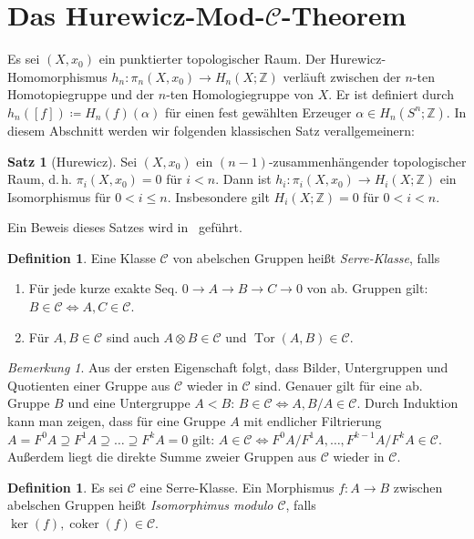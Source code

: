 \documentclass[11pt, a4paper, german]{article}
\theoremstyle{definition}
\newtheorem{satz}[lem]{Satz}
\newtheorem{defn}[lem]{Definition}
\theoremstyle{remark}
\newtheorem*{bem}{Bemerkung}
\newcommand{\Z}{\mathbb{Z}} %
\DeclareMathOperator{\coker}{coker} %
\DeclareMathOperator{\Tor}{Tor} %
\newcommand{\SC}{\mathcal{C}} %
\renewcommand{\dh}{d.\,h.} %
\begin{document}
\section{Das Hurewicz-Mod-$\SC$-Theorem}

Es sei $(X, x_0)$ ein punktierter topologischer Raum.
Der Hurewicz-Homomorphismus $h_n : \pi_n(X, x_0) \to H_n(X; \Z)$ verläuft zwischen der $n$-ten Homotopiegruppe und der $n$-ten Homologiegruppe von $X$.
Er ist definiert durch $h_n([f]) \coloneqq H_n(f)(\alpha)$ für einen fest gewählten Erzeuger $\alpha \in H_n(S^n; \Z)$.
In diesem Abschnitt werden wir folgenden klassischen Satz verallgemeinern:

\begin{satz}[Hurewicz]
  Sei $(X, x_0)$ ein $(n{-}1)$-zusammenhängender topologischer Raum, \dh{} $\pi_i(X, x_0) = 0$ für $i < n$.
  Dann ist $h_i : \pi_i(X, x_0) \to H_i(X; \Z)$ ein Isomorphismus für $0 < i \leq n$.
  Insbesondere gilt $H_i(X; \Z) = 0$ für $0 < i < n$.
\end{satz}

Ein Beweis dieses Satzes wird in~\cite[\mbox{}4.32]{hatcher:at} geführt.

\begin{defn}\label{serre-class}
  Eine Klasse $\SC$ von abelschen Gruppen heißt \emph{Serre-Klasse}, falls
  \begin{enumerate}
    \item Für jede kurze exakte Seq. $0 \to A \to B \to C \to 0$ von ab. Gruppen gilt: $B \in \SC \Leftrightarrow A, C \in \SC$.
    \item Für $A, B \in \SC$ sind auch $A \otimes B \in \SC$ und $\Tor(A, B) \in \SC$.
  \end{enumerate}
\end{defn}

\begin{bem}
  Aus der ersten Eigenschaft folgt, dass Bilder, Untergruppen und Quotienten einer Gruppe aus $\SC$ wieder in $\SC$ sind.
  Genauer gilt für eine ab. Gruppe $B$ und eine Untergruppe $A < B$: $B \in \SC \iff A, B/A \in \SC$.
  Durch Induktion kann man zeigen, dass für eine Gruppe $A$ mit endlicher Filtrierung
  $A = F^0 A \supseteq F^1 A \supseteq \ldots \supseteq F^k A = 0$
  gilt: $A \in \SC \iff F^0 A / F^1 A, \ldots, F^{k-1} A / F^k A \in \SC$.
  Außerdem liegt die direkte Summe zweier Gruppen aus $\SC$ wieder in $\SC$.
\end{bem}

\begin{defn}
  Es sei $\SC$ eine Serre-Klasse.
  Ein Morphismus $f : A \to B$ zwischen abelschen Gruppen heißt \emph{Isomorphimus modulo $\SC$}, falls $\ker(f), \coker(f) \in \SC$. \\
\end{defn}
\end{document}
